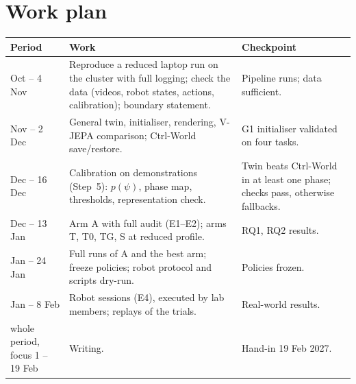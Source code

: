 \section{Work plan}\label{method:sec:plan}
\begin{center}\small
\begin{tabularx}{\linewidth}{@{}>{\raggedright\arraybackslash}p{3.1cm}>{\raggedright\arraybackslash}X>{\raggedright\arraybackslash}p{4.6cm}@{}}
\toprule
\textbf{Period} & \textbf{Work} & \textbf{Checkpoint}\\
\midrule
15 Oct -- 4 Nov & Reproduce a reduced laptop run on the cluster with full logging; check the data (videos, robot states, actions, calibration); boundary statement. & Pipeline runs; data sufficient.\\
5 Nov -- 2 Dec & General twin, initialiser, rendering, V-JEPA comparison; Ctrl-World save/restore. & G1 initialiser validated on four tasks.\\
3 Dec -- 16 Dec & Calibration on demonstrations (Step~5): $p(\psi)$, phase map, thresholds, representation check. & Twin beats Ctrl-World in at least one phase; checks pass, otherwise fallbacks.\\
17 Dec -- 13 Jan & Arm A with full audit (E1--E2); arms T, T0, TG, S at reduced profile. & RQ1, RQ2 results.\\
14 Jan -- 24 Jan & Full runs of A and the best arm; freeze policies; robot protocol and scripts dry-run. & Policies frozen.\\
25 Jan -- 8 Feb & Robot sessions (E4), executed by lab members; replays of the trials. & Real-world results.\\
whole period, focus 1 -- 19 Feb & Writing. & Hand-in 19 Feb 2027.\\
\bottomrule
\end{tabularx}
\end{center}

